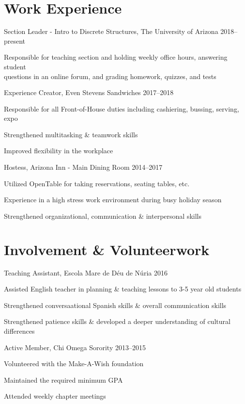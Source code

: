 \documentclass[]{friggeri-cv} %
\begin{document}
\section{Work Experience}
\begin{entrylist}

\entry%
{Section Leader - Intro to Discrete Structures{\normalfont , The University of Arizona}}%
{2018--present}
{%
	\item{Responsible for teaching section and holding weekly office hours, answering student \\ questions in an online forum, and grading homework, quizzes, and tests}
}
\entry
{Experience Creator{\normalfont , Even Stevens Sandwiches}}
{2017--2018}
{%
	\item{Responsible for all Front-of-House duties including cashiering, bussing, serving, expo}
	\item{Strengthened multitasking \& teamwork skills}
	\item{Improved flexibility in the workplace}
}
\entry
{Hostess{\normalfont , Arizona Inn - Main Dining Room}}
{2014--2017}
{%
		\item{Utilized OpenTable for taking reservations, seating tables, etc.}
		\item{Experience in a high stress work environment during busy holiday season}
		\item{Strengthened organizational, communication \& interpersonal skills}%
}


\end{entrylist}

\section{Involvement \& Volunteerwork}
\begin{entrylist}
\entry
{Teaching Assistant{\normalfont , Escola Mare de D\'{e}u de N\'{u}ria}}
{2016}
{
	\item{Assisted English teacher in planning \& teaching lessons to 3-5 year old students}
	\item{Strengthened conversaational Spanish skills \& overall communication skills}
	\item{Strengthened patience skills \& developed a deeper understanding of cultural differences}
}
\entry
{Active Member{\normalfont , Chi Omega Sorority}}
{2013--2015}
{
	\item{Volunteered with the Make-A-Wish foundation}
	\item{Maintained the required minimum GPA}
	\item{Attended weekly chapter meetings}
}
\end{entrylist}
\end{document}
